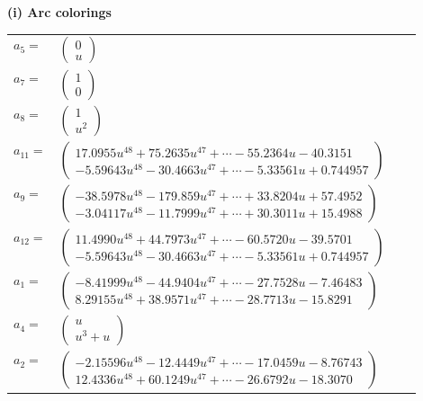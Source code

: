 \documentclass[1p]{elsarticle_modified}
\theoremstyle{definition}
\begin{document}
\flushleft \textbf{(i) Arc colorings}\\
\begin{tabular}{m{7pt} m{180pt} m{7pt} m{180pt} }
\flushright $a_{5}=$&$\begin{pmatrix}0\\u\end{pmatrix}$ \\
\flushright $a_{7}=$&$\begin{pmatrix}1\\0\end{pmatrix}$ \\
\flushright $a_{8}=$&$\begin{pmatrix}1\\u^2\end{pmatrix}$ \\
\flushright $a_{11}=$&$\begin{pmatrix}17.0955 u^{48}+75.2635 u^{47}+\cdots-55.2364 u-40.3151\\-5.59643 u^{48}-30.4663 u^{47}+\cdots-5.33561 u+0.744957\end{pmatrix}$ \\
\flushright $a_{9}=$&$\begin{pmatrix}-38.5978 u^{48}-179.859 u^{47}+\cdots+33.8204 u+57.4952\\-3.04117 u^{48}-11.7999 u^{47}+\cdots+30.3011 u+15.4988\end{pmatrix}$ \\
\flushright $a_{12}=$&$\begin{pmatrix}11.4990 u^{48}+44.7973 u^{47}+\cdots-60.5720 u-39.5701\\-5.59643 u^{48}-30.4663 u^{47}+\cdots-5.33561 u+0.744957\end{pmatrix}$ \\
\flushright $a_{1}=$&$\begin{pmatrix}-8.41999 u^{48}-44.9404 u^{47}+\cdots-27.7528 u-7.46483\\8.29155 u^{48}+38.9571 u^{47}+\cdots-28.7713 u-15.8291\end{pmatrix}$ \\
\flushright $a_{4}=$&$\begin{pmatrix}u\\u^3+u\end{pmatrix}$ \\
\flushright $a_{2}=$&$\begin{pmatrix}-2.15596 u^{48}-12.4449 u^{47}+\cdots-17.0459 u-8.76743\\12.4336 u^{48}+60.1249 u^{47}+\cdots-26.6792 u-18.3070\end{pmatrix}$ \\

\end{tabular}
\end{document}
